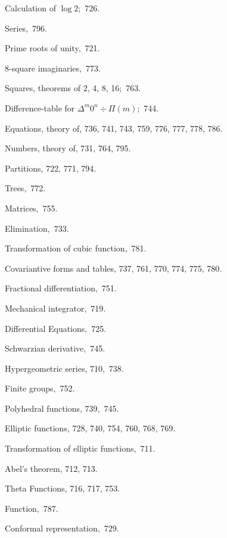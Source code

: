 \documentclass[12pt,a4paper,oneside]{book}
\begin{document}
\begin{list}{}{%
  \setlength{\leftmargin}{2em}\setlength{\itemsep}{0pt}%
  \setlength{\parsep}{0pt}\setlength{\topsep}{0.3em}}
\item Calculation of $\log 2$;~726.
\item Series,~796.
\item Prime roots of unity,~721.
\item 8-square imaginaries,~773.
\item Squares, theorems of 2, 4, 8, 16;~763.
\item Difference-table for $\Delta^m 0^n \div \Pi(m)$;~744.
\item Equations, theory of, 736, 741, 743, 759, 776, 777, 778, 786.
\item Numbers, theory of, 731, 764, 795.
\item Partitions, 722, 771, 794.
\item Trees,~772.
\item Matrices,~755.
\item Elimination,~733.
\item Transformation of cubic function,~781.
\item Covariantive forms and tables, 737, 761, 770, 774, 775, 780.
\item Fractional differentiation,~751.
\item Mechanical integrator,~719.
\item Differential Equations,~725.
\item Schwarzian derivative,~745.
\item Hypergeometric series, 710,~738.
\item Finite groups,~752.
\item Polyhedral functions, 739,~745.
\item Elliptic functions, 728, 740, 754, 760, 768, 769.
\item Transformation of elliptic functions,~711.
\item Abel's theorem, 712, 713.
\item Theta Functions, 716, 717, 753.
\item Function,~787.
\item Conformal representation,~729.
\end{list}

\clearpage

\vspace*{1em}
\end{document}
